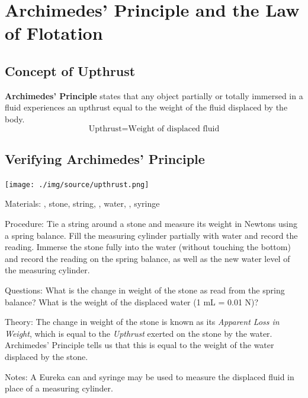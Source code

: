 \section{Archimedes' Principle and the Law of Flotation}

\begin{multicols}{2}


\section*{Concept of Upthrust}
\textbf{Archimedes' Principle} states that any object partially or totally immersed in a fluid experiences an upthrust equal to the weight of the fluid displaced by the body.
$$ \text{Upthrust} = \text{Weight of displaced fluid}$$

\subsection{Verifying Archimedes' Principle}

\begin{center}
\texttt{[image: ./img/source/upthrust.png]}
\end{center}

\begin{description*}
\item[Materials:]{, stone, string, , water, , syringe}
\item[Procedure:]{Tie a string around a stone and measure its weight in Newtons using a spring balance. Fill the measuring cylinder partially with water and record the reading. Immerse the stone fully into the water (without touching the bottom) and record the reading on the spring balance, as well as the new water level of the measuring cylinder.}
\item[Questions:]{What is the change in weight of the stone as read from the spring balance? What is the weight of the displaced water (1 mL = 0.01 N)?}
\item[Theory:]{The change in weight of the stone is known as its \emph{Apparent Loss in Weight}, which is equal to the \emph{Upthrust} exerted on the stone by the water. Archimedes' Principle tells us that this is equal to the weight of the water displaced by the stone.}
\item[Notes:]{A Eureka can and syringe may be used to measure the displaced fluid in place of a measuring cylinder.}
\end{description*}


\end{multicols}
